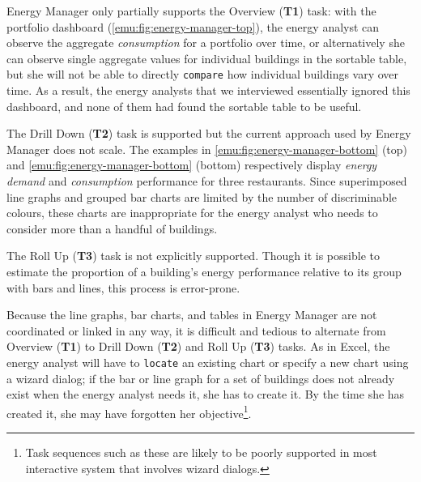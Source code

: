 Energy Manager only partially supports the Overview ({\bf T1}) task: with the portfolio dashboard (\autoref{emu:fig:energy-manager-top}), the energy analyst can observe the aggregate {\it consumption} for a portfolio over time, or alternatively she can observe single aggregate values for individual buildings in the sortable table, but she will not be able to directly {\tt compare} how individual buildings vary over time.
As a result, the energy analysts that we interviewed essentially ignored this dashboard, and none of them had found the sortable table to be useful. 

The Drill Down ({\bf T2}) task is supported but the current approach used by Energy Manager does not scale.
The examples in \autoref{emu:fig:energy-manager-bottom} (top) and \autoref{emu:fig:energy-manager-bottom} (bottom) respectively display {\it energy demand} and {\it consumption} performance for three restaurants.
Since superimposed line graphs and grouped bar charts are limited by the number of discriminable colours, these charts are inappropriate for the energy analyst who needs to consider more than a handful of buildings.

The Roll Up ({\bf T3}) task is not explicitly supported. Though it is possible to estimate the proportion of a building's energy performance relative to its group with bars and lines, this process is error-prone.

 Because the line graphs, bar charts, and tables in Energy Manager are not coordinated or linked in any way, it is difficult and tedious to alternate from Overview ({\bf T1}) to Drill Down ({\bf T2}) and Roll Up ({\bf T3}) tasks. 
As in Excel, the energy analyst will have to {\tt locate} an existing chart or specify a new chart using a wizard dialog; if the bar or line graph for a set of buildings does not already exist when the energy analyst needs it, she has to create it. 
By the time she has created it, she may have forgotten her objective\footnote{Task sequences such as these are likely to be poorly supported in most interactive system that involves wizard dialogs.}.

